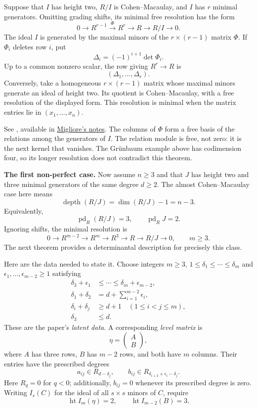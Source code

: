 \begin{theorem}
\label{theorem-hilbert-burch}
Suppose that $I$ has height two, $R/I$ is
Cohen--Macaulay, and $I$ has $r$ minimal
generators. Omitting grading shifts, its
minimal free resolution has the form
$$
0\longrightarrow R^{r-1}
\xrightarrow{\Phi}R^r
\longrightarrow R\longrightarrow R/I
\longrightarrow0.
$$
The ideal $I$ is generated by the maximal
minors of the $r\times(r-1)$ matrix
$\Phi$. If $\Phi_i$ deletes row $i$, put
$$
\Delta_i=(-1)^{i+1}\det\Phi_i.
$$
Up to a common nonzero scalar, the row
giving $R^r\to R$ is
$$
(\Delta_1,\ldots,\Delta_r).
$$
Conversely, take a homogeneous
$r\times(r-1)$ matrix whose maximal
minors generate an ideal of height two.
Its quotient is Cohen--Macaulay, with a
free resolution of the displayed form.
This resolution is minimal
when the matrix entries lie in
$(x_1,\ldots,x_n)$.
\end{theorem}

See \cite[Theorem 5.1]{migliore-cocoa},
available in
\href{https://academicweb.nd.edu/%
~jmiglior/CoCoANotes.pdf}{Migliore's notes}.
The columns of $\Phi$ form a free basis
of the relations among the generators
of $I$. The relation module is free,
not zero: it is the next kernel that
vanishes.
The Gr\"unbaum example above has
codimension four, so its longer resolution
does not contradict this theorem.

\medskip\noindent
{\bf The first non-perfect case.}
Now assume $n\geq3$ and that $J$ has
height two and three minimal generators
of the same degree $d\geq2$.
The almost Cohen--Macaulay case here means
$$
\operatorname{depth}(R/J)
=\dim(R/J)-1=n-3.
$$
Equivalently,
$$
\operatorname{pd}_R(R/J)=3,
\qquad\operatorname{pd}_R J=2.
$$
Ignoring shifts, the minimal resolution is
$$
0\longrightarrow R^{m-2}
\longrightarrow R^m
\longrightarrow R^3
\longrightarrow R\longrightarrow R/J
\longrightarrow0,
\qquad m\geq3.
$$
The next theorem provides a determinantal
description for precisely this class.

\medskip\noindent
Here are the data needed to state it.
Choose integers $m\geq3$,
$1\leq\delta_1\leq\cdots\leq\delta_m$
and $\epsilon_1,\ldots,\epsilon_{m-2}\geq1$
satisfying
$$
\begin{aligned}
\delta_3+\epsilon_1
&\leq\cdots\leq\delta_m+\epsilon_{m-2},\\
\delta_1+\delta_2
&=d+\sum_{i=1}^{m-2}\epsilon_i,\\
\delta_i+\delta_j&\geq d+1
\quad(1\leq i<j\leq m),\\
\delta_3&\leq d.
\end{aligned}
$$
These are the paper's {\it latent data}.
A corresponding {\it level matrix} is
$$
\eta=\begin{pmatrix}A\\B\end{pmatrix},
$$
where $A$ has three rows, $B$ has $m-2$
rows, and both have $m$ columns. Their
entries have the prescribed degrees
$$
a_{ij}\in R_{d-\delta_j},
\qquad
b_{ij}\in
R_{\delta_{i+2}+\epsilon_i-\delta_j}.
$$
Here $R_q=0$ for $q<0$; additionally,
$b_{ij}=0$ whenever its prescribed degree
is zero. Writing $I_s(C)$ for the ideal
of all $s\times s$ minors of $C$, require
$$
\operatorname{ht}I_m(\eta)=2,
\qquad
\operatorname{ht}I_{m-2}(B)=3.
$$

